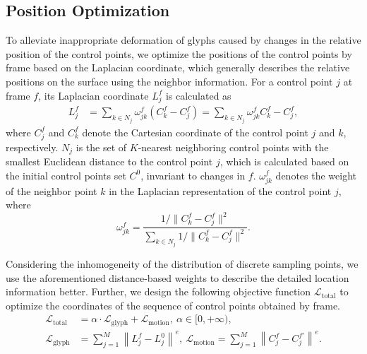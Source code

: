 \subsection{Position Optimization}
To alleviate inappropriate deformation of glyphs caused by changes in the relative position of the control points, we optimize the positions of the control points by frame based on the Laplacian coordinate, which generally describes the relative positions on the surface using the neighbor information.
For a control point $j$ at frame $f$, its Laplacian coordinate $L_j^f$ is calculated as
$$
\begin{aligned}
    L_{j}^f &= \sum_{k \in N_{j}}\omega_{jk}^f\left(C_{k}^f-C_{j}^f\right) =\sum_{k \in N_{j}}\omega_{jk}^f C_{k}^f - C_{j}^f,
\end{aligned}
$$
where $C_j^f$ and $C_k^f$ denote the Cartesian coordinate of the control point $j$ and $k$, respectively. $N_{j}$ is the set of $K$-nearest neighboring control points with the smallest Euclidean distance to the control point $j$, which is calculated based on the initial control points set $C^0$, invariant to changes in $f$. $\omega_{jk}^f$ denotes the weight of the neighbor point $k$ in the Laplacian representation of the control point $j$, where
$$
\omega_{jk}^f=\frac{1 / \|C^{f}_{k} - C^{f}_{j}\|^{2}}{\sum_{k \in N_j} 1 /\|C_{k}^f - C_{j}^f\|^{2}}.
$$

Considering the inhomogeneity of the distribution of discrete sampling points, we use the aforementioned distance-based weights to describe the detailed location information better.
Further, we design the following objective function  $\mathcal{L}_{\text{total}}$ to optimize the coordinates of the sequence of control points obtained by frame.
$$
\begin{aligned}
 \mathcal{L}_{\text{total}} &= \alpha \cdot  \mathcal{L}_{\text{glyph}} + \mathcal{L}_{\text{motion}}, \ \alpha\in[0,+\infty),\\
 \mathcal{L}_{\text{glyph}} &= \sum_{j=1}^{M}\left\|L_{j}^f-L_{j}^0\right\|^{e},\  
 \mathcal{L}_{\text{motion}} = \sum_{j=1}^{M}\left\|C_j^f - C_j^{f\prime}\right\|^{e}.\\
\end{aligned}
$$


